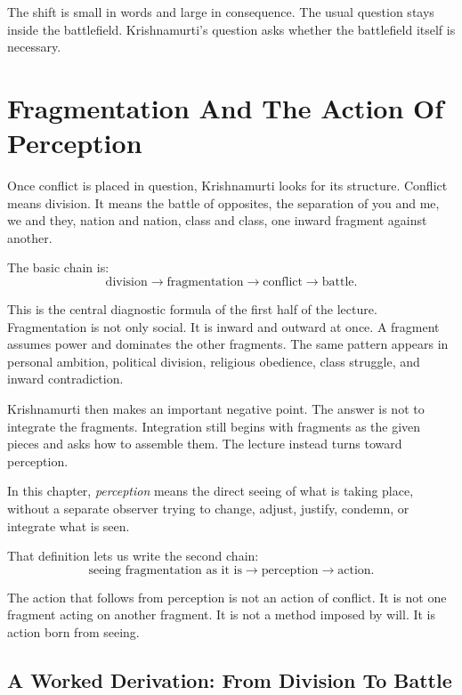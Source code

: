 The shift is small in words and large in consequence. The usual question stays inside the battlefield. Krishnamurti's question asks whether the battlefield itself is necessary.

\section{Fragmentation And The Action Of Perception}

Once conflict is placed in question, Krishnamurti looks for its structure. Conflict means division. It means the battle of opposites, the separation of you and me, we and they, nation and nation, class and class, one inward fragment against another.

The basic chain is:
\begin{equation}
\text{division}
   \longrightarrow
\text{fragmentation}
   \longrightarrow
\text{conflict}
   \longrightarrow
\text{battle}.
\end{equation}

This is the central diagnostic formula of the first half of the lecture. Fragmentation is not only social. It is inward and outward at once. A fragment assumes power and dominates the other fragments. The same pattern appears in personal ambition, political division, religious obedience, class struggle, and inward contradiction.

Krishnamurti then makes an important negative point. The answer is not to integrate the fragments. Integration still begins with fragments as the given pieces and asks how to assemble them. The lecture instead turns toward perception.

\begin{definition}
In this chapter, \emph{perception} means the direct seeing of what is taking place, without a separate observer trying to change, adjust, justify, condemn, or integrate what is seen.
\end{definition}

That definition lets us write the second chain:
\begin{equation}
\text{seeing fragmentation as it is}
   \longrightarrow
\text{perception}
   \longrightarrow
\text{action}.
\end{equation}

The action that follows from perception is not an action of conflict. It is not one fragment acting on another fragment. It is not a method imposed by will. It is action born from seeing.

\subsection{A Worked Derivation: From Division To Battle}

